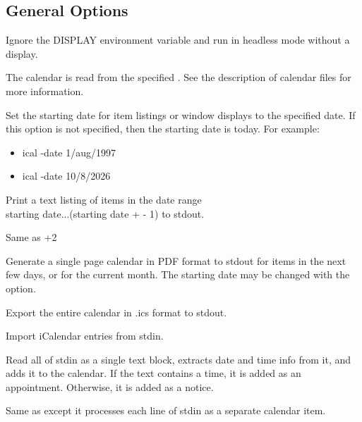 \documentclass[a4paper,english]{article}
\begin{document}
\subsection{General Options}
\begin{Description}\setlength{\itemsep}{0cm}
\item[\oOptArg{-nodisplay}{}]
    Ignore the DISPLAY environment variable and run in headless
    mode without a display.

\item[\OptArg{-calendar}{ filename}]
    The calendar is read from the specified .  See the
    description of calendar files for more information.

\item[\oOptArg{-date}{ date}]
    Set the starting date for item listings or window displays
    to the specified date. If this option is not specified,
    then the starting date is today. For example:
    \begin{itemize}
        \item ical -date 1/aug/1997
        \item ical -date 10/8/2026
    \end{itemize}

\item[\oOptArg{-show}{ +days}]
    Print a text listing of items in the date range \\
    \Lbr starting date...(starting date +  - 1)\Rbr
    to stdout.

\item[\oOptArg{-list}{}]
    Same as  +2

\item[\oOptArg{-print}{ 1|2|4|8|10|month}]
    Generate a single page calendar in PDF format to stdout for
    items in the next few days, or for the current month.  The
    starting date may be changed with the  option.

\item[\oOptArg{-exportics}{}]
    Export the entire calendar in .ics format to stdout.

\item[\oOptArg{-importics}{}]
    Import iCalendar entries from stdin.

\item[\oOptArg{-addone}{}]
    Read all of stdin as a single text block, extracts date
    and time info from it, and adds it to the calendar. If
    the text contains a time, it is added as an appointment.
    Otherwise, it is added as a notice.

\item[\oOptArg{-addmultiple}{}]
    Same as  except it processes each line of
    stdin as a separate calendar item.

\end{Description}
\end{document}
